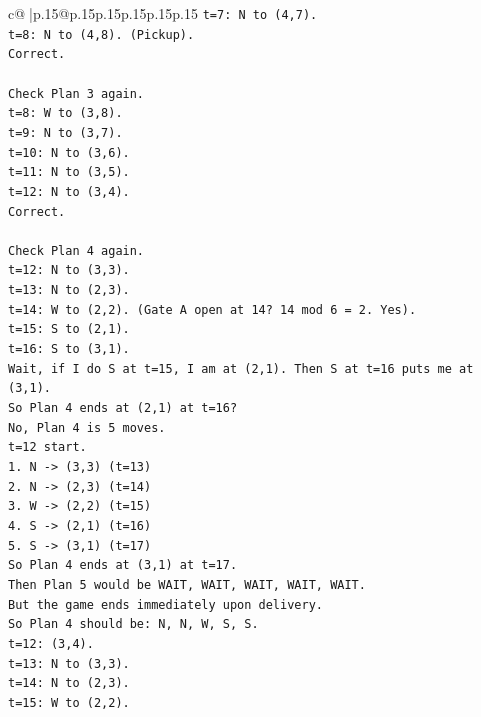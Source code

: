 \documentclass{article}
\begin{document}
{\begin{supertabular}{c@{$\;$}|p{.15\linewidth}@{}p{.15\linewidth}p{.15\linewidth}p{.15\linewidth}p{.15\linewidth}p{.15\linewidth}}
{{{\texttt{t=7: N to (4,7).} \\
\texttt{t=8: N to (4,8). (Pickup).} \\
\texttt{Correct.} \\
\\ 
\texttt{Check Plan 3 again.} \\
\texttt{t=8: W to (3,8).} \\
\texttt{t=9: N to (3,7).} \\
\texttt{t=10: N to (3,6).} \\
\texttt{t=11: N to (3,5).} \\
\texttt{t=12: N to (3,4).} \\
\texttt{Correct.} \\
\\ 
\texttt{Check Plan 4 again.} \\
\texttt{t=12: N to (3,3).} \\
\texttt{t=13: N to (2,3).} \\
\texttt{t=14: W to (2,2). (Gate A open at 14? 14 mod 6 = 2. Yes).} \\
\texttt{t=15: S to (2,1).} \\
\texttt{t=16: S to (3,1).} \\
\texttt{Wait, if I do S at t=15, I am at (2,1). Then S at t=16 puts me at (3,1).} \\
\texttt{So Plan 4 ends at (2,1) at t=16?} \\
\texttt{No, Plan 4 is 5 moves.} \\
\texttt{t=12 start.} \\
\texttt{1. N {-}> (3,3) (t=13)} \\
\texttt{2. N {-}> (2,3) (t=14)} \\
\texttt{3. W {-}> (2,2) (t=15)} \\
\texttt{4. S {-}> (2,1) (t=16)} \\
\texttt{5. S {-}> (3,1) (t=17)} \\
\texttt{So Plan 4 ends at (3,1) at t=17.} \\
\texttt{Then Plan 5 would be WAIT, WAIT, WAIT, WAIT, WAIT.} \\
\texttt{But the game ends immediately upon delivery.} \\
\texttt{So Plan 4 should be: N, N, W, S, S.} \\
\texttt{t=12: (3,4).} \\
\texttt{t=13: N to (3,3).} \\
\texttt{t=14: N to (2,3).} \\
\texttt{t=15: W to (2,2).} \\
}}}
\end{supertabular}}
\end{document}
